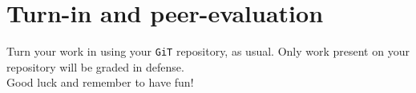 \documentclass{42-en}
\begin{document}
\chapter{Turn-in and peer-evaluation}

    Turn your work in using your \texttt{GiT} repository, as
    usual. Only work present on your repository will be graded in defense.\\

	Good luck and remember to have fun!



\end{document}
